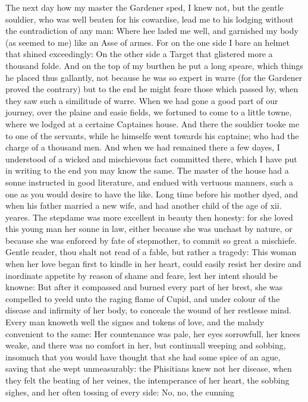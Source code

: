 The next day how my master the Gardener sped, I knew not, but the gentle
souldier, who was well beaten for his cowardise, lead me to his lodging without
the contradiction of any man: Where hee laded me well, and garnished my body
(as seemed to me) like an Asse of armes. For on the one side I bare an helmet
that shined exceedingly: On the other side a Target that glistered more a
thousand folde. And on the top of my burthen he put a long speare, which things
he placed thus gallantly, not because he was so expert in warre (for the
Gardener proved the contrary) but to the end he might feare those which passed
by, when they saw such a similitude of warre. When we had gone a good part of
our journey, over the plaine and easie fields, we fortuned to come to a little
towne, where we lodged at a certaine Captaines house. And there the souldier
tooke me to one of the servants, while he himselfe went towards his captaine;
who had the charge of a thousand men. And when we had remained there a few
dayes, I understood of a wicked and mischievous fact committed there, which I
have put in writing to the end you may know the same. The master of the house
had a sonne instructed in good literature, and endued with vertuous manners,
such a one as you would desire to have the like. Long time before his mother
dyed, and when his father married a new wife, and had another child of the age
of xii. yeares. The stepdame was more excellent in beauty then honesty: for she
loved this young man her sonne in law, either because she was unchast by
nature, or because she was enforced by fate of stepmother, to commit so great a
mischiefe. Gentle reader, thou shalt not read of a fable, but rather a tragedy:
This woman when her love began first to kindle in her heart, could easily
resist her desire and inordinate appetite by reason of shame and feare, lest
her intent should be knowne: But after it compassed and burned every part of
her brest, she was compelled to yeeld unto the raging flame of Cupid, and under
colour of the disease and infirmity of her body, to conceale the wound of her
restlesse mind. Every man knoweth well the signes and tokens of love, and the
malady convenient to the same: Her countenance was pale, her eyes sorrowfull,
her knees weake, and there was no comfort in her, but continuall weeping and
sobbing, insomuch that you would have thought that she had some spice of an
ague, saving that she wept unmeasurably: the Phisitians knew not her disease,
when they felt the beating of her veines, the intemperance of her heart, the
sobbing sighes, and her often tossing of every side: No, no, the cunning
